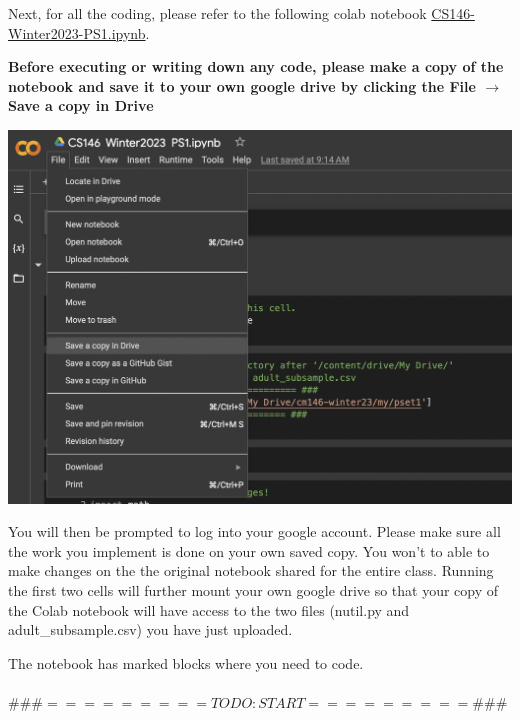 \ifsoln
\else
\clearpage
\fi

Next, for all the coding, please refer to the following colab notebook  
\href{https://drive.google.com/file/d/10CFm6dfRr3WXjERC6sE682xVZhaewCPj/view?usp=share_link}{CS146-Winter2023-PS1.ipynb}. 

\textbf{Before executing or writing down any code, please make a copy of the notebook and save it to your own google drive by clicking the File $\rightarrow$ Save a copy in Drive} 

\begin{minipage}[c]{.5\textwidth}
\centering
\includegraphics[scale=0.5]{save-colab-to-drive.png}
\end{minipage}%
\begin{minipage}[c]{.45\textwidth}
\end{minipage}%


You will then be prompted to log into your google account. Please make sure all the work you implement is done on your own saved copy. You won't to able to make changes on the the original notebook shared for the entire class. Running the first two cells will further mount your own google drive so that your copy of the Colab notebook will have access to the two files (nutil.py and adult\_subsample.csv) you have just uploaded.

The notebook has marked blocks where you need to code. \\
\\
 $\#\#\# ========= TODO  : START ========= \#\#\# $
 
